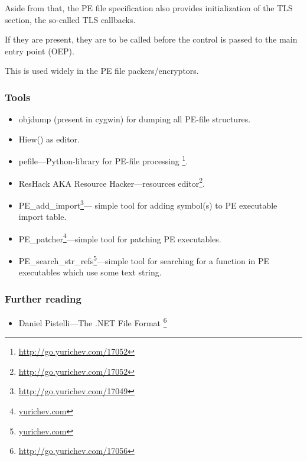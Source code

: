 Aside from that, the PE file specification also provides initialization of the
\ac{TLS} section, the so-called TLS callbacks.

If they are present, they are to be called before the control is passed to the main entry point (\ac{OEP}).

This is used widely in the PE file packers/encryptors.

\subsubsection{Tools}

\label{ResHack}

\begin{itemize}
\item objdump (present in cygwin) for dumping all PE-file structures.

\item Hiew() as editor.

\item pefile---Python-library for PE-file processing \footnote{\url{http://go.yurichev.com/17052}}.

\item ResHack \acs{AKA} Resource Hacker---resources editor\footnote{\url{http://go.yurichev.com/17052}}.

\item PE\_add\_import\footnote{\url{http://go.yurichev.com/17049}}---
simple tool for adding symbol(s) to PE executable import table.

\item PE\_patcher\footnote{\href{http://go.yurichev.com/17054}{yurichev.com}}---simple tool for patching PE executables.

\item PE\_search\_str\_refs\footnote{\href{http://go.yurichev.com/17055}{yurichev.com}}---simple tool for searching for a function in PE executables which use some text string.
\end{itemize}

\subsubsection{Further reading}

\begin{itemize}
\item Daniel Pistelli---The .NET File Format \footnote{\url{http://go.yurichev.com/17056}}
\end{itemize}

